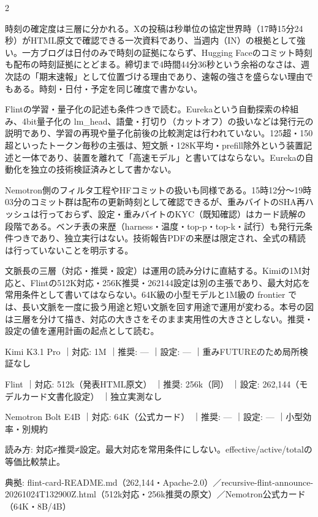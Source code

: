 \documentclass[lualatex,a4paper,10pt]{jlreq}
\begin{document}
\begin{multicols}{2} %


時刻の確定度は三層に分かれる。Xの投稿は秒単位の協定世界時（17時15分24秒）がHTML原文で確認できる一次資料であり、当週内（IN）の根拠として強い。一方ブログは日付のみで時刻の証拠にならず、Hugging Faceのコミット時刻も配布の時刻証拠にとどまる。締切まで4時間44分36秒という余裕のなさは、週次誌の「期末速報」として位置づける理由であり、速報の強さを盛らない理由でもある。時刻・日付・予定を同じ確度で書かない。


Flintの学習・量子化の記述も条件つきで読む。Eurekaという自動探索の枠組み、4bit量子化の lm\_head、語彙・打切り（カットオフ）の扱いなどは発行元の説明であり、学習の再現や量子化前後の比較測定は行われていない。125超・150超といったトークン毎秒の主張は、短文脈・128K平均・prefill除外という装置記述と一体であり、装置を離れて「高速モデル」と書いてはならない。Eurekaの自動化を独立の技術検証済みとして書かない。


Nemotron側のフィルタ工程やHFコミットの扱いも同様である。15時12分～19時03分のコミット群は配布の更新時刻として確認できるが、重みバイトのSHA再ハッシュは行っておらず、設定・重みバイトのKYC（既知確認）はカード読解の段階である。ベンチ表の来歴（harness・温度・top-p・top-k・試行）も発行元条件つきであり、独立実行はない。技術報告PDFの来歴は限定され、全式の精読は行っていないことを明示する。


文脈長の三層（対応・推奨・設定）は運用の読み分けに直結する。Kimiの1M対応と、Flintの512K対応・256K推奨・262144設定は別の主張であり、最大対応を常用条件として書いてはならない。64K級の小型モデルと1M級の frontier では、長い文脈を一度に扱う用途と短い文脈を回す用途で運用が変わる。本号の図は三層を分けて描き、対応の大きさをそのまま実用性の大きさとしない。推奨・設定の値を運用計画の起点として読む。


\end{multicols} %
{\centering
\begin{tcolorbox}[colback=SurveySoft,colframe=SurveyAccent,arc=1mm,boxrule=0.4pt,left=2mm,right=2mm,title={文脈長の三層}]
{\footnotesize 
Kimi K3.1 Pro ｜対応: 1M ｜推奨: — ｜設定: — ｜重みFUTUREのため局所検証なし\par
Flint ｜対応: 512k（発表HTML原文） ｜推奨: 256k（同） ｜設定: 262,144（モデルカード文書化設定） ｜独立実測なし\par
Nemotron Bolt E4B ｜対応: 64K（公式カード） ｜推奨: — ｜設定: — ｜小型効率・別規約\par
読み方: 対応≠推奨≠設定。最大対応を常用条件にしない。effective/active/totalの等価比較禁止。\par
典拠: flint-card-README.md（262,144・Apache-2.0）／recursive-flint-announce-20261024T132900Z.html（512k対応・256k推奨の原文）／Nemotron公式カード（64K・8B/4B）\par
\par}
\end{tcolorbox}
} %
\end{document}
